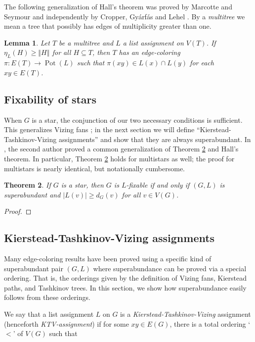 \documentclass[12pt]{article}
\theoremstyle{plain}
\newtheorem{thm}{Theorem}[section]
\newtheorem{lem}[thm]{Lemma}
\theoremstyle{definition}
\theoremstyle{remark}
\newcommand{\size}[1]{\left\Vert#1\right\Vert}
\newcommand{\func}[3]{#1\colon #2 \rightarrow #3}
\newcommand{\pot}{\operatorname{Pot}}
\begin{document}
The following generalization of Hall's theorem was proved by Marcotte and Seymour \cite{marcotte1990extending} and independently by Cropper, Gy{\'a}rf{\'a}s and Lehel \cite{cropper2003edge}.  By a \emph{multitree} we mean a tree that possibly has edges of multiplicity greater than one.

\begin{lem}\label{MultiTreeHall}
Let $T$ be a multitree and $L$ a list assignment on $V(T)$.  If $\eta_L(H) \ge \size{H}$ for all $H \subseteq T$, then $T$ has an edge-coloring $\func{\pi}{E(T)}{\pot(L)}$ such that
$\pi(xy) \in L(x) \cap L(y)$ for each $xy \in E(T)$.
\end{lem}

\subsection{Fixability of stars}
When $G$ is a star, the conjunction of our two necessary conditions is sufficient. This generalizes Vizing fans \cite{Vizing76}; in the next section we will define ``Kierstead-Tashkinov-Vizing assignments'' and show that they are always superabundant.  In \cite{HallGame}, the second author proved a common generalization of Theorem \ref{FixabilityOfStars} and Hall's theorem.  In particular, Theorem \ref{FixabilityOfStars} holds for multistars as well; the proof for multistars is nearly identical, but notationally cumbersome.

\begin{thm}\label{FixabilityOfStars}
If $G$ is a star, then $G$ is $L$-fixable if and only if $(G, L)$ is superabundant and $|L(v)| \ge d_G(v)$ for all $v \in V(G)$.
\end{thm}
\begin{proof}
\end{proof}

\subsection{Kierstead-Tashkinov-Vizing assignments}
Many edge-coloring results have been proved using a specific kind of
superabundant pair $(G, L)$ where superabundance can be proved via a special
ordering. That is, the orderings given by the definition of Vizing fans,
Kierstead paths, and Tashkinov trees.  In this section, we show how
superabundance easily follows from these orderings.

We say that a list assignment $L$ on $G$ is a \emph{Kierstead-Tashkinov-Vizing} assignment (henceforth \emph{KTV-assignment}) if for some $xy \in E(G)$, there is a total ordering `$<$' of $V(G)$ such that
\end{document}
